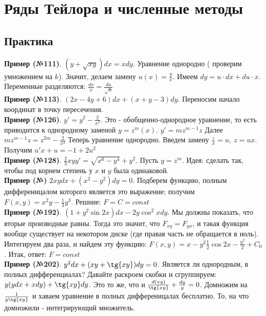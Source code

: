 \section{Ряды Тейлора и численные методы}

\subsection{Практика}
\textbf{Пример (№111)}. $(y+\sqrt{xy})dx=xdy$. Уравнение однородно (
проверим умножением на $k$). Значит, делаем замену $u(x)=\frac{y}{x}$.
Имеем $dy=u\cdot dx+du\cdot x$. Переменные разделяются: 
$\frac{dx}{x}=\frac{du}{\sqrt{u}}$\\
\textbf{Пример (№113)}. $(2x-4y+6)dx+(x+y-3)dy$. Переносим начало координат
в точку пересечения.\\
\textbf{Пример (№126)}. $y'=y^2-\frac{2}{x^2}$. Это - обобщенно-однородное
уравнение, то есть приводится к однородному заменой $y=z^m(x)$.
$y'=mz^{m-1}z$ Далее
$mz^{m-1}z=z^{2m}-\frac{2}{x^2}$ 
Теперь уравнение однородно. Введем замену $\frac{z}{x}=u,~z=ux$.
Получим $u'x+u=-1+2u^2$\\
\textbf{Пример (№128)}. $\frac{2}{3}xyy'=\sqrt{x^6-y^4}+y^2$. 
Пусть $y=z^m$. Идея: сделать так, чтобы под корнем степень у $x$ и $y$ была
одинаковой.\\
\textbf{Пример (№)} $2xydx+(x^2-y^2)dy=0$. Подберем функцию, полным 
дифференицалом которого является это выражение; получим  $F(x,y)=
x^2y-\frac{1}{3}y^3$. Решние: $F=C=const$\\
\textbf{Пример (№192)}. $(1+y^2\sin{2x})dx-2y\cos^2{x}dy$. Мы должны 
показать, что вторые производные равны. Тогда это значит, что
$F_{xy}=F_{yx}$, и такая функция вообще существует на некотором диске
(где правая часть не обращается в ноль). Интегируем два раза, и найдем эту
функцию: $F(x,y)=x-y^2 \frac{1}{2}\cos{2x}-\frac{y^2}{2}+C_0$.
Итак, ответ: $\boxed{F=const}$ \\
\textbf{Пример (№202)}. $y^2dx+(xy+\tg{xy})dy=0$. Является ли однородным,
в полных дифференциалах? Давайте раскроем скобки и сгруппируем:
$y(ydx+xdy)+\tg{xy}dy$. Это то же, что и  $\frac{d(xy)}{\tg{xy}}+\frac{dy}{y}
=0$. Домножим на $\frac{1}{y\tg{xy}}$ и хаваем уравнение в полных 
дифференицалах бесплатно. То, на что домножили - интегрирующий множитель.














